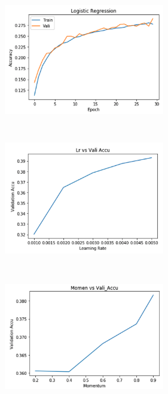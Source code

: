 \documentclass{article}
\begin{document}
\includegraphics[width=7cm, height=6cm]{plots/A5a_0.png}
\includegraphics[width=7cm, height=6cm]{plots/A5a_1.png} \\
\includegraphics[width=7cm, height=6cm]{plots/A5a_2.png}
\end{document}

